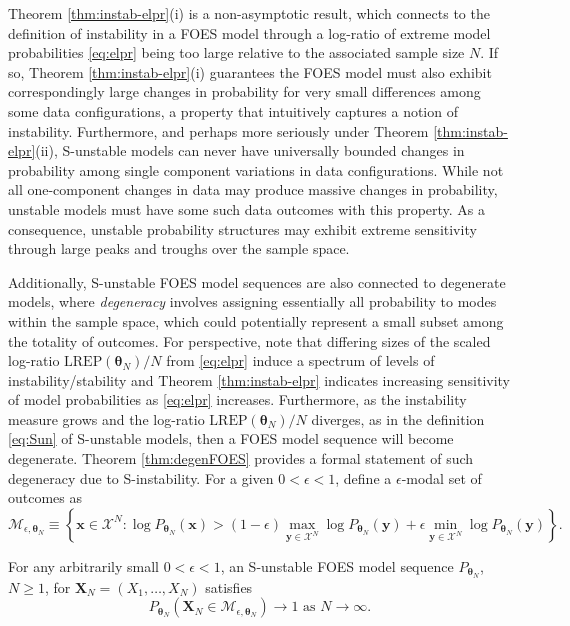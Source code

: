 \documentclass[numbib]{imamat}
\theoremstyle{theorem}
\theoremstyle{lemma}
\theoremstyle{example}
\theoremstyle{corollary}
\theoremstyle{definition}
\theoremstyle{remark}
\theoremstyle{approximation}
\theoremstyle{scheme}
\newcommand{\REP}{\mathrm{LREP}}
\let\BeginKnitrBlock\begin \let\EndKnitrBlock\end
\begin{document}
Theorem \ref{thm:instab-elpr}(i) is a non-asymptotic result, which connects to the definition of instability in a FOES model through a log-ratio of extreme model probabilities \eqref{eq:elpr} being too large relative to the associated sample size \(N\). If so, Theorem \ref{thm:instab-elpr}(i) guarantees the FOES model must also exhibit correspondingly large changes in probability for very small differences among some data configurations, a property that intuitively captures a notion of instability. Furthermore, and perhaps more seriously under Theorem \ref{thm:instab-elpr}(ii),
S-unstable models can never have universally bounded changes in probability among single component variations in data configurations. While not all one-component changes in data may produce massive changes in probability, unstable models must have some such data outcomes with this property. As a consequence, unstable probability structures may exhibit extreme sensitivity through large peaks and troughs over the sample space.

Additionally, S-unstable FOES model sequences are also connected to degenerate models, where \emph{degeneracy} involves assigning essentially all probability to modes within the sample space, which could potentially represent a small subset among the totality of outcomes. For perspective, note that differing sizes of the scaled log-ratio \(\REP(\boldsymbol \theta_N)/N\) from \eqref{eq:elpr} induce a spectrum of levels of instability/stability and Theorem \ref{thm:instab-elpr} indicates increasing sensitivity of model probabilities as \eqref{eq:elpr} increases. Furthermore, as the instability measure grows and the log-ratio \(\REP(\boldsymbol \theta_N)/N\) diverges, as in the definition \eqref{eq:Sun} of S-unstable models, then a FOES model sequence will become degenerate. Theorem \ref{thm:degenFOES} provides a formal statement of such degeneracy due to S-instability. For a given \(0 < \epsilon < 1\), define a \(\epsilon\)-modal set of outcomes as
\begin{equation}
\label{eq:mode}
\mathcal{M}_{\epsilon, \boldsymbol \theta_N} \equiv \left\{\boldsymbol x \in \mathcal{X}^N: \log P_{\boldsymbol \theta_N}(\boldsymbol x) > (1-\epsilon)\max\limits_{\boldsymbol y \in \mathcal{X}^N} \log  P_{\boldsymbol \theta_N}(\boldsymbol y) + \epsilon\min\limits_{\boldsymbol y \in \mathcal{X}^N} \log P_{\boldsymbol \theta_N}(\boldsymbol y) \right\}.
\end{equation}
\BeginKnitrBlock{theorem}
\protect\hypertarget{thm:degenFOES}{}{\label{thm:degenFOES} }For any arbitrarily small \(0 < \epsilon < 1\), an S-unstable FOES model sequence \(P_{\boldsymbol \theta_N}\), \(N \geq 1\), for \(\boldsymbol X_N=(X_1, \dots, X_N)\) satisfies
\[
P_{\boldsymbol \theta_N}\left( \boldsymbol X_N\in \mathcal{M}_{\epsilon, \boldsymbol \theta_N}\right) \rightarrow 1 \text{ as } N \rightarrow \infty.
\]
\EndKnitrBlock{theorem}
\end{document}

